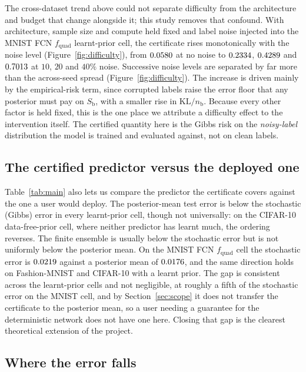 The cross-dataset trend above could not separate difficulty from the architecture
and budget that change alongside it; this study removes that confound. With
architecture, sample size and compute held fixed and label noise injected into the
MNIST FCN $f_{\text{quad}}$ learnt-prior cell, the certificate rises monotonically
with the noise level (Figure~\ref{fig:difficulty}), from
$0.0580$ at no noise to
$0.2334$, $0.4289$ and
$0.7013$ at $10$, $20$ and $40\%$ noise. Successive
noise levels are separated by far more than the across-seed spread
(Figure~\ref{fig:difficulty}). The increase is
driven mainly by the empirical-risk term, since corrupted labels raise the error
floor that any posterior must pay on $S_{\mathrm b}$, with a smaller rise in
$\mathrm{KL}/n_{\mathrm b}$. Because
every other factor is held fixed, this is the one place we attribute a difficulty
effect to the intervention itself. The certified quantity here is the Gibbs risk
on the \emph{noisy-label} distribution the model is trained and evaluated
against, not on clean labels.

\subsection{The certified predictor versus the deployed one}\label{sec:deploygap}

Table~\ref{tab:main} also lets us compare the predictor the certificate covers
against the one a user would deploy. The posterior-mean test error is below the
stochastic (Gibbs) error in every learnt-prior cell, though not universally: on
the CIFAR-10 data-free-prior cell, where neither predictor has learnt much, the
ordering reverses. The finite ensemble is usually below the stochastic error but
is not uniformly below the posterior mean. On the MNIST FCN $f_{\text{quad}}$
cell the stochastic error is $0.0219$ against a posterior mean
of $0.0176$, and the same direction holds on Fashion-MNIST
and CIFAR-10 with a learnt prior. The gap is consistent across the learnt-prior
cells and not negligible, at roughly a fifth of the stochastic error on the MNIST
cell, and by Section~\ref{sec:scope} it does not transfer the certificate to the
posterior mean, so a user needing a guarantee for the deterministic network does
not have one here. Closing that gap is the clearest theoretical extension of the
project.

\subsection{Where the error falls}\label{sec:erroranalysis}

